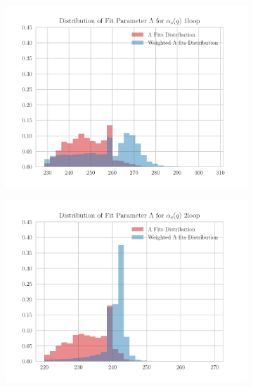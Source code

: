 \begin{figure}[hbt!]
    \centering
    \begin{subfigure}{0.49\textwidth}
        \centering
        \includegraphics[width=1\textwidth]{results/hist1.pdf}
    \end{subfigure}
    \begin{subfigure}{0.49\textwidth}
        \centering
        \includegraphics[width=1\textwidth]{results/hist2.pdf}
    \end{subfigure}


\end{figure}
